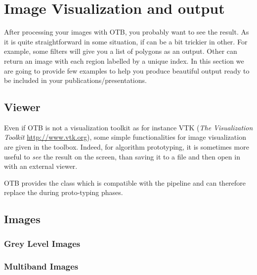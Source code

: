\chapter{Image Visualization and output}
\label{chap:ImageVisualization}

After processing your images with OTB, you probably want to see the result. As it is quite straightforward in some situation, if can be a bit trickier in other. For example, some filters will give you a list of polygons as an output. Other can return an image with each region labelled by a unique index. In this section we are going to provide few examples to help you produce beautiful output ready to be included in your publications/presentations.


\section{Viewer}
Even if OTB is not a visualization toolkit as for instance VTK
(\emph{The Visualization Toolkit} \url{http://www.vtk.org}), some
simple functionalities for image visualization are given in the
toolbox. Indeed, for algorithm prototyping, it is sometimes more
useful to \emph{see} the result on the screen, than saving it to a
file and then open in with an external viewer.

OTB provides the  class which is compatible
with the pipeline and can therefore replace the
 during proto-typing phases.




\section{Images}

\subsection{Grey Level Images}
\label{sec:ViewingGreyLevelImages}



\subsection{Multiband Images}
\label{sec:ViewingMultibandImages}





